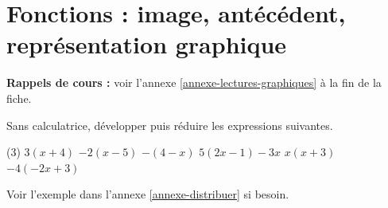 \documentclass[10pt,a4paper]{article}
\begin{document}

\section{Fonctions : image, antécédent, représentation graphique}

\textbf{Rappels de cours :} voir l'annexe \ref{annexe-lectures-graphiques} à la fin de la fiche.
\nopagebreak

\begin{bloc}
\begin{exo}
Sans calculatrice, développer puis réduire les expressions suivantes.
\begin{tasks}(3)
    \task \(3(x+4)\)
    \task \(-2(x-5)\)
    \task \(-(4-x)\)
    \task \(5(2x-1)-3x\)
    \task \(x(x+3)\)
    \task \(-4(-2x+3)\)
\end{tasks}
\end{exo}

\begin{indication}
    Voir l'exemple dans l'annexe \ref{annexe-distribuer} si besoin.
\end{indication}
\end{bloc}
\end{document}
